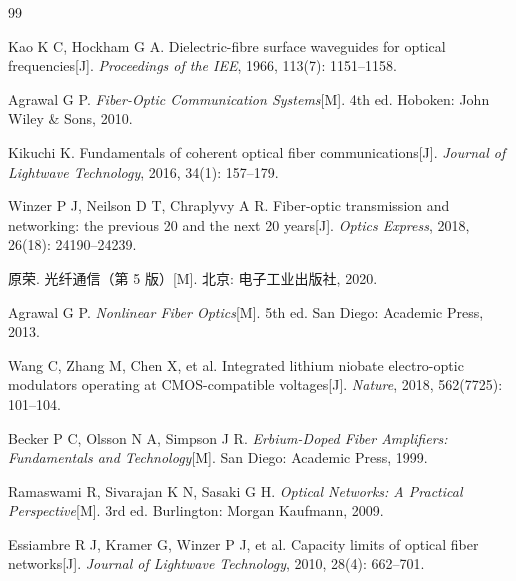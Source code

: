 \documentclass[a4paper,11pt,UTF8,fontset=fandol]{ctexart}
\begin{document}
\begin{thebibliography}{99}

 Kao K C, Hockham G A. Dielectric-fibre surface waveguides for optical frequencies[J]. \textit{Proceedings of the IEE}, 1966, 113(7): 1151--1158.

 Agrawal G P. \textit{Fiber-Optic Communication Systems}[M]. 4th ed. Hoboken: John Wiley \& Sons, 2010.

 Kikuchi K. Fundamentals of coherent optical fiber communications[J]. \textit{Journal of Lightwave Technology}, 2016, 34(1): 157--179.

 Winzer P J, Neilson D T, Chraplyvy A R. Fiber-optic transmission and networking: the previous 20 and the next 20 years[J]. \textit{Optics Express}, 2018, 26(18): 24190--24239.

 原荣. 光纤通信（第 5 版）[M]. 北京: 电子工业出版社, 2020.

 Agrawal G P. \textit{Nonlinear Fiber Optics}[M]. 5th ed. San Diego: Academic Press, 2013.

 Wang C, Zhang M, Chen X, et al. Integrated lithium niobate electro-optic modulators operating at CMOS-compatible voltages[J]. \textit{Nature}, 2018, 562(7725): 101--104.

 Becker P C, Olsson N A, Simpson J R. \textit{Erbium-Doped Fiber Amplifiers: Fundamentals and Technology}[M]. San Diego: Academic Press, 1999.

 Ramaswami R, Sivarajan K N, Sasaki G H. \textit{Optical Networks: A Practical Perspective}[M]. 3rd ed. Burlington: Morgan Kaufmann, 2009.

 Essiambre R J, Kramer G, Winzer P J, et al. Capacity limits of optical fiber networks[J]. \textit{Journal of Lightwave Technology}, 2010, 28(4): 662--701.

\end{thebibliography}
\end{document}
